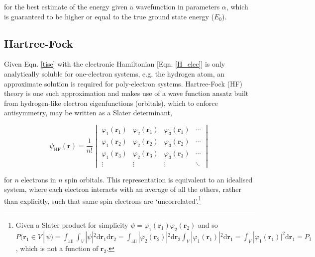 \documentclass[main.tex]{subfiles}
\begin{document}
 for the best estimate of the energy given a wavefunction in parameters $\alpha$, which is guaranteed to be higher or equal to the true ground state energy ($E_0$).

\subsection{Hartree-Fock}

Given Eqn. \eqref{tise} with the electronic Hamiltonian [Eqn. \eqref{H_elec}] is only analytically soluble for one-electron systems, e.g. the hydrogen atom, an approximate solution is required for poly-electron systems. Hartree-Fock (HF) theory is one such approximation and makes use of a wave function ansatz built from hydrogen-like electron eigenfunctions (orbitals), which to enforce antisymmetry, may be written as a Slater determinant,

\begin{equation}
\psi_\text{HF}(\boldsymbol{r}) = \frac{1}{n!}
\begin{vmatrix}
\varphi_1(\boldsymbol{r}_1) & \varphi_2(\boldsymbol{r}_1) & \varphi_3(\boldsymbol{r}_1) & \cdots \\
\varphi_1(\boldsymbol{r}_2) & \varphi_2(\boldsymbol{r}_2) & \varphi_3(\boldsymbol{r}_2) & \cdots \\
\varphi_1(\boldsymbol{r}_3) & \varphi_2(\boldsymbol{r}_3) & \varphi_3(\boldsymbol{r}_3) & \cdots \\
\vdots & \vdots & \vdots & \ddots
\end{vmatrix}
\label{equation::slater_det}
\end{equation}

for $n$ electrons in $n$ spin orbitals. This representation is equivalent to an idealised system, where each electron interacts with an average of all the others, rather than explicitly, such that same spin electrons are `uncorrelated'.\footnote{Given a Slater product for simplicity $\psi = \varphi_1(\boldsymbol{r}_1)\varphi_2(\boldsymbol{r}_2)$ and so $P(\boldsymbol{r}_1 \in V \,|\, \psi) =  \int_\text{all}\int_V |\psi|^2 \text{d}\boldsymbol{r}_1\text{d}\boldsymbol{r}_2 = \int_\text{all}|\varphi_2(\boldsymbol{r}_2)|^2\text{d}\boldsymbol{r}_2\int_V |\varphi_1(\boldsymbol{r}_1)|^2\text{d}\boldsymbol{r}_1 = \int_V |\varphi_1(\boldsymbol{r}_1)|^2\text{d}\boldsymbol{r}_1 = P_1$, which is not a function of $\boldsymbol{r}_2$.}
\end{document}
